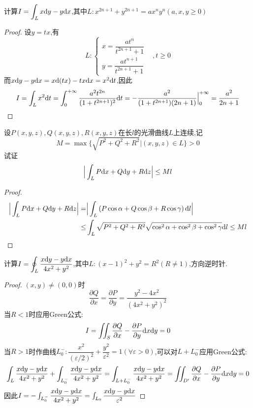 \documentclass[UTF8]{book}
\begin{document}
\begin{example}
    \end{example}\begin{example}
        计算\(I=\displaystyle\int_{L}x\mathrm{d} y-y\mathrm{d} x\),其中\(L:x^{2n+1}+y^{2n+1}=ax^ny^n(a,x,y\geq 0)\)
        \begin{proof}
            设$y=tx$,有\[L:\begin{cases}
                x=\dfrac{at^n}{t^{2n+1}+1}&\\ 
                y=\dfrac{at^{n+1}}{t^{2n+1}+1}&
            \end{cases},t\geq 0\]
            而\(x\mathrm{d} y-y\mathrm{d} x=x\mathrm{d}(tx)-tx\mathrm{d} x=x^2\mathrm{d} t\),因此\[I=\int_L x^2\mathrm{d} t=\int_0^{+\infty}\frac{a^2t^{2n}}{(1+t^{2n+1})^2}\mathrm{d} t=-\frac{a^2}{(1+t^{2n+1})(2n+1)}\Big|^{+\infty}_0=\frac{a^2}{2n+1}\]
        \end{proof}
    \end{example}\begin{example}
        设$P(x,y,z),Q(x,y,z),R(x,y,z)$在长$l$的光滑曲线$L$上连续,记\[M=\max\{\sqrt{P^2+Q^2+R^2}\Big| (x,y,z)\in L\}>0\]
        试证\[\Big|\int_L P\mathrm{d} x+Q\mathrm{d} y+R\mathrm{d} z\Big|\leq Ml\]
        \begin{proof}
            \[\begin{aligned}
                \Big|\int_L P\mathrm{d} x+Q\mathrm{d} y+R\mathrm{d} z\Big|=&\Big|\int_L\left( P\cos \alpha+Q\cos \beta+R\cos \gamma \right)\mathrm{d} l\Big|\\ \leq&\int_L \sqrt{P^2+Q^2+R^2}\sqrt{\cos^2\alpha+\cos^2\beta+\cos^2\gamma}\mathrm{d} l\leq Ml
            \end{aligned}\]
        \end{proof}
    \end{example}\begin{example}
        计算\(I=\displaystyle\oint_{L} \dfrac{x\mathrm{d} y-y\mathrm{d} x}{4x^2+y^2}\),其中\(L:(x-1)^2+y^2=R^2(R\neq 1)\),方向逆时针.
        \begin{proof}
            $(x,y)\neq (0,0)$时\[\frac{\partial Q}{\partial x}=\frac{\partial P}{\partial y}=\frac{y^2-4x^2}{(4x^2+y^2)^2}\]
            当$R<1$时应用Green公式:\[I=\iint_S \frac{\partial Q}{\partial x}-\frac{\partial P}{\partial y}\mathrm{d} x\mathrm{d} y=0\]
            当$R>1$时作曲线$L_0^-:\dfrac{x^2}{(\varepsilon/2)^2}+\dfrac{y^2}{\varepsilon^2}=1(\forall \varepsilon>0)$,可以对$L+L_0^-$应用Green公式:
            \[\int_L \frac{x\mathrm{d} y-y\mathrm{d} x}{4x^2+y^2}+\int_{L_0^-}\frac{x\mathrm{d} y-y\mathrm{d} x}{4x^2+y^2}=\int_{L+L_0^-}\frac{x\mathrm{d} y-y\mathrm{d} x}{4x^2+y^2}=\iint_{D'} \frac{\partial Q}{\partial x}-\frac{\partial P}{\partial y}\mathrm{d} x\mathrm{d} y=0\]
            因此$I=-\int_{L_0^-}\dfrac{x\mathrm{d} y-y\mathrm{d} x}{4x^2+y^2}=\int_{L_0}\dfrac{x\mathrm{d} y-y\mathrm{d} x}{\varepsilon^2}$

\end{proof}
\end{example}
\end{document}
